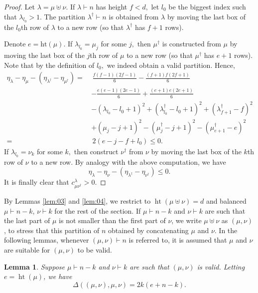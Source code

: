 \documentclass[12pt,dvipsnames,accepted=2016-08-18,a4paper,onecolumn]{quantumarticle}
\def\la{\lambda}
\DeclareMathOperator{\het}{ht}
\def\la{\lambda}
\numberwithin{equation}{section}
\newtheorem{lemma}[theorem]{Lemma}
\theoremstyle{definition}
\begin{document}
\begin{proof}
Let $\lambda=\mu\uplus\nu$. 
    If $\lambda \vdash n$ has height $f <d,$ let $l_0$ be the biggest index such that $\lambda_{l_0}>1.$ 
    The partition $\lambda^\dagger \vdash n$ is obtained from $\lambda$ 
    by moving the last box of the $l_0$th row of $\lambda$ to a new row (so that $\lambda^\dagger$ has $f+1$ rows).

Denote $e = \text{ht}(\mu).$
    If $\lambda_{l_0}=\mu_j$ for some $j,$ then $\mu^\dagger$ is constructed from $\mu$ by  moving the last box of the $j$th row of $\mu$ to a new row (so that $\mu^\dagger$ has $e+1$ rows). Note that by the definition of $l_0,$  we indeed obtain a valid partition. Hence,
    \begin{align*}
        \eta_\lambda  - \eta_\mu  - (\eta_{\lambda^\dagger}- \eta_{\mu^\dagger}) = \,& \,  \frac{f(f-1)(2f-1)}{6} - \frac{(f+1)f(2f+1)}{6} \\
        & - \frac{e(e-1)(2e-1)}{6} + \frac{(e+1)e(2e+1)}{6}\\
        \phantom{{}={}}& -   (\lambda_{l_0}-l_0+1)^2 + (\lambda^\dagger_{l_0}-l_0+1)^2 + (\lambda^\dagger_{f+1}-f)^2\\
        \phantom{{}={}}& +  (\mu_j-j+1)^2 - (\mu^\dagger_j-j+1)^2 - (\mu^\dagger_{e+1}-e)^2\\
        = \, & \,2 (e - j -f + l_0)  \leq 0. 
    \end{align*}
    If $\lambda_{l_0}=\nu_k$ for some $k,$ then construct $\nu^\dagger$ from $\nu$ by  moving the last box of the $k$th row of $\nu$ to a new row. By analogy with the above computation, we have 
    $$
    \eta_\lambda  - \eta_\nu  - (\eta_{\lambda^\dagger}- \eta_{\nu^\dagger}) \leq 0.
    $$
    It is finally clear that $c_{\mu \nu^\dagger}^\lambda >0.$ 
\end{proof}

By Lemmas \ref{lem:03} and \ref{lem:04}, we restrict to $\het(\mu\uplus\nu)=d$ and balanced $\mu\vdash n-k$, $\nu\vdash k$ for the rest of the section.
If $\mu\vdash n-k$ and $\nu\vdash k$ are such that the last part of $\mu$ is not smaller than the first part of $\nu$, we write $\mu\uplus\nu$ as $(\mu,\nu)$, to stress that this partition of $n$ obtained by concatenating $\mu$ and $\nu$. In the following lemmas, whenever $(\mu,\nu)\vdash n$ is referred to, it is assumed that $\mu$ and $\nu$ are suitable for $(\mu,\nu)$ to be valid.

\def\la{\lambda}
\begin{lemma}\label{lem:41}
Suppose $\mu\vdash n-k$ and $\nu\vdash k$ are such that $(\mu,\nu)$ is valid. 
Letting $e=\het(\mu)$, we have
\begin{equation}\label{eq:delta}
    \Delta((\mu,\nu),\mu,\nu)= 2 k (e + n -k).
\end{equation}
\end{lemma}
\end{document}
